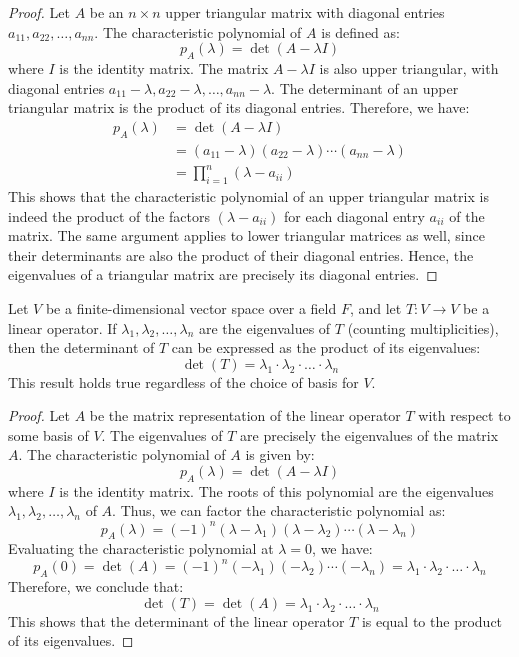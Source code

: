 \documentclass[openany]{book}
\begin{document}
\begin{proof}
    Let $A$ be an $n \times n$ upper triangular matrix with diagonal entries $a_{11}, a_{22}, \ldots, a_{nn}$. The characteristic polynomial of $A$ is defined as:
    $$p_A(\lambda) = \det(A - \lambda I)$$
    where $I$ is the identity matrix. The matrix $A - \lambda I$ is also upper triangular, with diagonal entries $a_{11} - \lambda, a_{22} - \lambda, \ldots, a_{nn} - \lambda$. The determinant of an upper triangular matrix is the product of its diagonal entries. Therefore, we have:
    \[
    \begin{aligned}
    p_A(\lambda) &= \det(A - \lambda I) \\
    &= (a_{11} - \lambda)(a_{22} - \lambda) \cdots (a_{nn} - \lambda) \\
    &= \prod_{i=1}^{n} (\lambda - a_{ii})
    \end{aligned}
    \]
    This shows that the characteristic polynomial of an upper triangular matrix is indeed the product of the factors $(\lambda - a_{ii})$ for each diagonal entry $a_{ii}$ of the matrix. The same argument applies to lower triangular matrices as well, since their determinants are also the product of their diagonal entries. Hence, the eigenvalues of a triangular matrix are precisely its diagonal entries.
\end{proof}
\begin{mytheorem}
    Let $V$ be a finite-dimensional vector space over a field $F$, and let $T: V \to V$ be a linear operator. If $\lambda_1, \lambda_2, \ldots, \lambda_n$ are the eigenvalues of $T$ (counting multiplicities), then the determinant of $T$ can be expressed as the product of its eigenvalues:
    $$\det(T) = \lambda_1 \cdot \lambda_2 \cdot \ldots \cdot \lambda_n$$
    This result holds true regardless of the choice of basis for $V$.
\end{mytheorem}
\begin{proof}
    Let $A$ be the matrix representation of the linear operator $T$ with respect to some basis of $V$. The eigenvalues of $T$ are precisely the eigenvalues of the matrix $A$. The characteristic polynomial of $A$ is given by:
    $$p_A(\lambda) = \det(A - \lambda I)$$
    where $I$ is the identity matrix. The roots of this polynomial are the eigenvalues $\lambda_1, \lambda_2, \ldots, \lambda_n$ of $A$. Thus, we can factor the characteristic polynomial as:
    $$p_A(\lambda) = (-1)^n (\lambda - \lambda_1)(\lambda - \lambda_2) \cdots (\lambda - \lambda_n)$$
    Evaluating the characteristic polynomial at $\lambda = 0$, we have:
    $$p_A(0) = \det(A) = (-1)^n (-\lambda_1)(-\lambda_2) \cdots (-\lambda_n) = \lambda_1 \cdot \lambda_2 \cdot \ldots \cdot \lambda_n$$
    Therefore, we conclude that:
    $$\det(T) = \det(A) = \lambda_1 \cdot \lambda_2 \cdot \ldots \cdot \lambda_n$$
    This shows that the determinant of the linear operator $T$ is equal to the product of its eigenvalues.
\end{proof}
\end{document}
